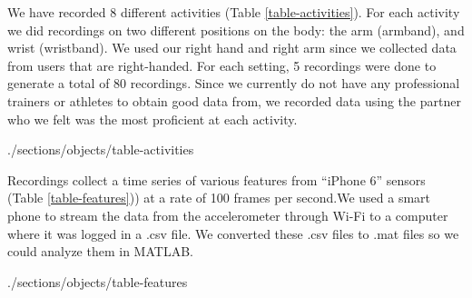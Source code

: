 We have recorded 8 different activities (Table \ref{table-activities}). For each activity we did recordings on two different positions on the body: the arm (armband), and wrist (wristband). We used our right hand and right arm since we collected data from users that are right-handed. For each setting, 5 recordings were done to generate a total of 80 recordings. Since we currently do not have any professional trainers or athletes to obtain good data from, we recorded data using the partner who we felt was the most proficient at each activity. 

 {./sections/objects/table-activities}

Recordings collect a time series of various features from  “iPhone 6” sensors (Table \ref{table-features})) at a rate of 100 frames per second.We used a smart phone to stream the data from the accelerometer through Wi-Fi to a computer where it was logged in a .csv file. We converted these .csv files to .mat files so we could analyze them in MATLAB.

 {./sections/objects/table-features}